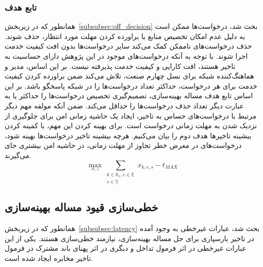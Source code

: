 \subsubsection{تابع هدف}
همانطور که در زیربخش~\ref{subsubsec:off_decision} بحث شد، درخواست‌ها ممکن است به دلیل عدم امکان تخصیص منابع یا براورده کردن مهلت مورد انتظار، حذف شوند. حذف درخواست‌های ناممکن کمک می‌کند سایر درخواست‌ها بدون افت کیفیت خدمت اجرا شوند. با توجه به آنکه درخواست‌های موجود در این پژوهش دارای حساسیت به تاخیر هستند، افت کارایی و کیفیت خدمت پذیرفته نیست. بر این اساس، مدیر و هماهنگ‌کننده شبکه  برای نسل چهارم صنعت، تلاش می‌کند ضمن براورده کردن کیفیت خدمت برای هر درخواست، حداکثر تعداد درخواست‌ها را در شبکه پاسخگو باشد. بر این اساس تابع هدف مساله بهینه‌سازی، تصمیم‌گیری تخصیص‌ درخواست‌ها را حداکثر یا به عبارت دیگر تعداد حذف درخواست‌ها را حداقل می‌کند. ضمن آنکه مولفه مهم دیگر مرتبط با درخواست‌های حساس به تاخیر، ایجاد یک حاشیه زمانی امن برای جلوگیری از نزدیک شدن به مهلت زمانی درخواست است. برای بهینه کردن این مهم، با کمینه کردن بیشینه تاخیرها هدف دوم را بیان می‌کنیم. هرچه بیشینه تاخیر درخواست‌ها بهینه شود، درخواست‌های در معرض خطر تجاوز از مهلت زمانی، در حاشیه امن بیشتری جای می‌گیرند.
\begin{equation} \label{eq:goal_func}
    \max_{x,z} \sum_{\substack{k \in \mathbb{K}_e, e \in \mathbb{E}\\ s \in \mathbb{S}}} x_{k,e,s} - t_{MAX}
\end{equation}

\subsection{خطی‌سازی قیود مساله بهینه‌سازی}
همانطور که در زیربخش~\ref{subsubsec:latency} بحث شد، عبارات غیرخطی به وجود آمده در تاخیر بارسپاری برای حل مساله بهینه‌سازی، نیازمند خطی‌سازی هستند. یکی از این عبارات غیرخطی در اثر فرمول تداخل و دیگری در اثر پهنای باند مشترک در فرمول تاخیر مخابره ایجاد شده است.
